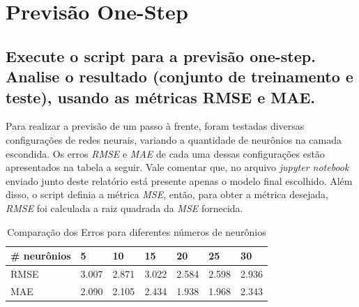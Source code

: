 \documentclass[12pt]{article}
\begin{document}
	\section{Previsão One-Step}
	
	\subsection{Execute o script para a previsão one-step. Analise o resultado (conjunto	de treinamento e teste), usando as métricas RMSE e MAE.}\label{subsec:2.1}
	
	Para realizar a previsão de um passo à frente, foram testadas diversas configurações de redes neurais, variando a quantidade de neurônios na camada escondida. Os erros \textit{RMSE} e \textit{MAE} de cada uma dessas configurações estão apresentados na tabela a seguir. Vale comentar que, no arquivo \textit{jupyter notebook} enviado junto deste relatório está presente apenas o modelo final escolhido. Além disso, o script definia a métrica \textit{MSE}, então, para obter a métrica desejada, \textit{RMSE} foi calculada a raiz quadrada da \textit{MSE} fornecida.
	
	\begin{table}[H]\label{tab:comparacaoNeuronios}
		\centering
		\begin{tabular}{|l|l|l|l|l|l|l|}
			\hline
			\# neurônios & 5     & 10    & 15    & 20    & 25    & 30    \\ \hline
			RMSE         & 3.007 & 2.871 & 3.022 & 2.584 & 2.598 & 2.936 \\ \hline
			MAE          & 2.090 & 2.105 & 2.434 & 1.938 & 1.968 & 2.343 \\ \hline
		\end{tabular}
	\caption{Comparação dos Erros para diferentes números de neurônios}
	\end{table}
\end{document}
